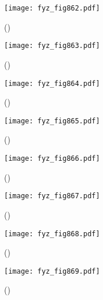 {    \begin{figure}[ht!] %
      \centering
      \texttt{[image: fyz\_fig862.pdf]}
      \caption{
               (\cite[s.~707]{Feynman02})}
      \label{fyz_fig862}
    \end{figure}

    \begin{figure}[ht!] %
      \centering
      \texttt{[image: fyz\_fig863.pdf]}
      \caption{
               (\cite[s.~707]{Feynman02})}
      \label{fyz_fig863}
    \end{figure}

    \begin{figure}[ht!] %
      \centering
      \texttt{[image: fyz\_fig864.pdf]}
      \caption{
               (\cite[s.~707]{Feynman02})}
      \label{fyz_fig864}
    \end{figure}

    \begin{figure}[ht!] %
      \centering
      \texttt{[image: fyz\_fig865.pdf]}
      \caption{
               (\cite[s.~707]{Feynman02})}
      \label{fyz_fig865}
    \end{figure}

    \begin{figure}[ht!] %
      \centering
      \texttt{[image: fyz\_fig866.pdf]}
      \caption{
               (\cite[s.~707]{Feynman02})}
      \label{fyz_fig866}
    \end{figure}

    \begin{figure}[ht!] %
      \centering
      \texttt{[image: fyz\_fig867.pdf]}
      \caption{
               (\cite[s.~707]{Feynman02})}
      \label{fyz_fig867}
    \end{figure}

    \begin{figure}[ht!] %
      \centering
      \texttt{[image: fyz\_fig868.pdf]}
      \caption{
               (\cite[s.~707]{Feynman02})}
      \label{fyz_fig868}
    \end{figure}

    \begin{figure}[ht!] %
      \centering
      \texttt{[image: fyz\_fig869.pdf]}
      \caption{
               (\cite[s.~707]{Feynman02})}
      \label{fyz_fig869}
    \end{figure}

}
